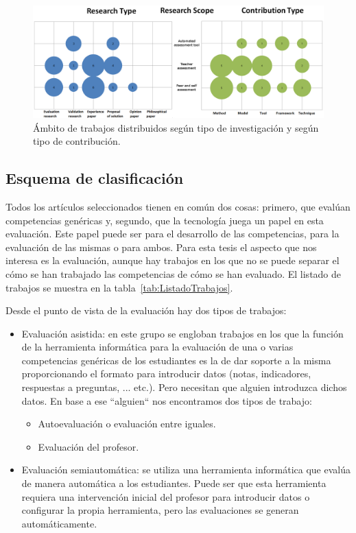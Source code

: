 \pagestyle{empty}
\begin{landscape}
\begin{figure}[H]
  \begin{center}
    \includegraphics[scale=0.4]{Burbujas.png}
  \end{center}
  \caption{Ámbito de trabajos distribuidos según tipo de investigación y según tipo de contribución.}
  \label{fig:Burble}
\end{figure}
\end{landscape}
\pagestyle{fancy}


\subsection{Esquema de clasificación}

Todos los artículos seleccionados tienen en común dos cosas: primero, que evalúan competencias genéricas y, segundo, que la tecnología juega un papel en esta evaluación. Este papel puede ser para el desarrollo de las competencias, para la evaluación de las mismas o para ambos. Para esta tesis el aspecto que nos interesa es la evaluación, aunque hay trabajos en los que no se puede separar el cómo se han trabajado las competencias de cómo se han evaluado. El listado de trabajos se muestra en la tabla~\ref{tab:ListadoTrabajos}.

Desde el punto de vista de la evaluación hay dos tipos de trabajos:
\begin{itemize}
\item Evaluación asistida: en este grupo se engloban trabajos en los que la función de la herramienta informática para la evaluación de una o varias competencias genéricas de los estudiantes es la de dar soporte a la misma proporcionando el formato para introducir datos (notas, indicadores, respuestas a preguntas, ... etc.). Pero necesitan que alguien introduzca dichos datos. En base a ese ``alguien`` nos encontramos dos tipos de trabajo:
	\begin{itemize}
		\item Autoevaluación o evaluación entre iguales.
		\item Evaluación del profesor.
	\end{itemize}
\item Evaluación semiautomática:  se utiliza una herramienta informática que evalúa de manera automática a los estudiantes. Puede ser que esta herramienta requiera una intervención inicial del profesor para introducir datos o configurar la propia herramienta, pero las evaluaciones se generan automáticamente.
\end{itemize}

